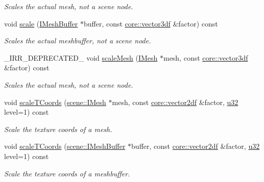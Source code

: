 \begin{DoxyCompactItemize}
\begin{DoxyCompactList}\small\item\em Scales the actual mesh, not a scene node. \end{DoxyCompactList}\item 
void \hyperlink{classirr_1_1scene_1_1IMeshManipulator_a6aa8b1bd153c7e524e8200988078282f}{scale} (\hyperlink{classirr_1_1scene_1_1IMeshBuffer}{I\+Mesh\+Buffer} $\ast$buffer, const \hyperlink{namespaceirr_1_1core_a06f169d08b5c429f5575acb7edbad811}{core\+::vector3df} \&factor) const
\begin{DoxyCompactList}\small\item\em Scales the actual meshbuffer, not a scene node. \end{DoxyCompactList}\item 
\+\_\+\+I\+R\+R\+\_\+\+D\+E\+P\+R\+E\+C\+A\+T\+E\+D\+\_\+ void \hyperlink{classirr_1_1scene_1_1IMeshManipulator_a00f8ef80adfd5bb15644b64e8cd9f55e}{scale\+Mesh} (\hyperlink{classirr_1_1scene_1_1IMesh}{I\+Mesh} $\ast$mesh, const \hyperlink{namespaceirr_1_1core_a06f169d08b5c429f5575acb7edbad811}{core\+::vector3df} \&factor) const
\begin{DoxyCompactList}\small\item\em Scales the actual mesh, not a scene node. \end{DoxyCompactList}\item 
void \hyperlink{classirr_1_1scene_1_1IMeshManipulator_a2bc907891c8db77eebcad387ae3b31c3}{scale\+T\+Coords} (\hyperlink{classirr_1_1scene_1_1IMesh}{scene\+::\+I\+Mesh} $\ast$mesh, const \hyperlink{namespaceirr_1_1core_a2cf08556d77f6f5a792973a6e27ed11b}{core\+::vector2df} \&factor, \hyperlink{namespaceirr_a0416a53257075833e7002efd0a18e804}{u32} level=1) const
\begin{DoxyCompactList}\small\item\em Scale the texture coords of a mesh. \end{DoxyCompactList}\item 
void \hyperlink{classirr_1_1scene_1_1IMeshManipulator_ad9e58b8382ab8d7a84b2383590f6d147}{scale\+T\+Coords} (\hyperlink{classirr_1_1scene_1_1IMeshBuffer}{scene\+::\+I\+Mesh\+Buffer} $\ast$buffer, const \hyperlink{namespaceirr_1_1core_a2cf08556d77f6f5a792973a6e27ed11b}{core\+::vector2df} \&factor, \hyperlink{namespaceirr_a0416a53257075833e7002efd0a18e804}{u32} level=1) const
\begin{DoxyCompactList}\small\item\em Scale the texture coords of a meshbuffer. \end{DoxyCompactList}\item 

\end{DoxyCompactItemize}
